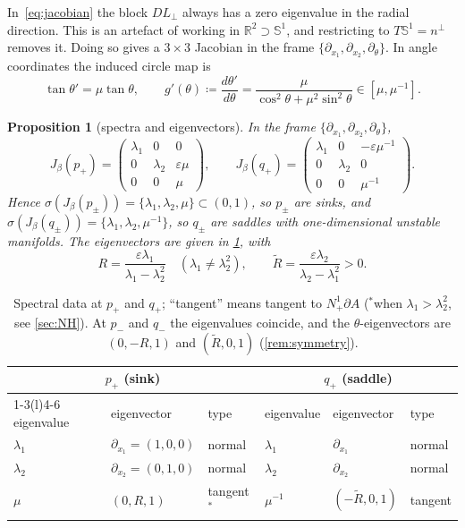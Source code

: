 \documentclass[11pt,a4paper]{article}
\newtheorem{proposition}[theorem]{Proposition}
\theoremstyle{definition}
\theoremstyle{remark}
\newcommand{\R}{\mathbb{R}}
\newcommand{\eps}{\varepsilon}
\newcommand{\Sph}{\mathbb{S}}
\newcommand{\Nb}{N^1_+\partial A}
\newcommand{\Lperp}{L_\perp}
\begin{document}
In~\eqref{eq:jacobian} the block $D\Lperp$ always has a zero eigenvalue in the radial direction. This is an artefact
of working in $\R^2\supset\Sph^1$, and restricting to $T\Sph^1=n^\perp$ removes it. Doing so gives a $3\times3$
Jacobian in the frame $\{\partial_{x_1},\partial_{x_2},\partial_\theta\}$. In angle coordinates the induced circle map
is
\begin{equation}\label{eq:circle}
  \tan\theta'=\mu\tan\theta,\qquad g'(\theta)\coloneqq\frac{d\theta'}{d\theta}=\frac{\mu}{\cos^2\theta+\mu^2\sin^2\theta}\in[\mu,\mu^{-1}].
\end{equation}

\begin{proposition}[spectra and eigenvectors]\label{prop:spectra}
In the frame $\{\partial_{x_1},\partial_{x_2},\partial_\theta\}$,
\[
  J_\beta(p_+)=\begin{pmatrix}\lambda_1&0&0\\0&\lambda_2&\eps\mu\\0&0&\mu\end{pmatrix},\qquad
  J_\beta(q_+)=\begin{pmatrix}\lambda_1&0&-\eps\mu^{-1}\\0&\lambda_2&0\\0&0&\mu^{-1}\end{pmatrix}.
\]
Hence $\sigma(J_\beta(p_\pm))=\{\lambda_1,\lambda_2,\mu\}\subset(0,1)$, so $p_\pm$ are sinks, and
$\sigma(J_\beta(q_\pm))=\{\lambda_1,\lambda_2,\mu^{-1}\}$, so $q_\pm$ are saddles with one-dimensional unstable manifolds.
The eigenvectors are given in \cref{tab:eig}, with
\[
  R=\frac{\eps\lambda_1}{\lambda_1-\lambda_2^2}\quad(\lambda_1\neq\lambda_2^2),\qquad
  \tilde R=\frac{\eps\lambda_2}{\lambda_2-\lambda_1^2}>0.
\]
\end{proposition}

\begin{table}[ht]
\centering
\small
\begin{tabular}{@{}lll@{\quad}lll@{}}
\toprule
\multicolumn{3}{c}{$p_+$ (sink)} & \multicolumn{3}{c}{$q_+$ (saddle)}\\
\cmidrule(r){1-3}\cmidrule(l){4-6}
eigenvalue & eigenvector & type & eigenvalue & eigenvector & type\\
\midrule
$\lambda_1$ & $\partial_{x_1}=(1,0,0)$ & normal & $\lambda_1$ & $\partial_{x_1}$ & normal\\
$\lambda_2$ & $\partial_{x_2}=(0,1,0)$ & normal & $\lambda_2$ & $\partial_{x_2}$ & normal\\
$\mu$ & $(0,R,1)$ & tangent$^{*}$ & $\mu^{-1}$ & $(-\tilde R,0,1)$ & tangent\\
\bottomrule
\end{tabular}
\caption{Spectral data at $p_+$ and $q_+$; ``tangent'' means tangent to $\Nb$ ($^{*}$when $\lambda_1>\lambda_2^2$, see \cref{sec:NH}). At $p_-$ and $q_-$ the eigenvalues coincide, and the $\theta$-eigenvectors are
$(0,-R,1)$ and $(\tilde R,0,1)$ (\cref{rem:symmetry}).}
\label{tab:eig}
\end{table}
\end{document}
